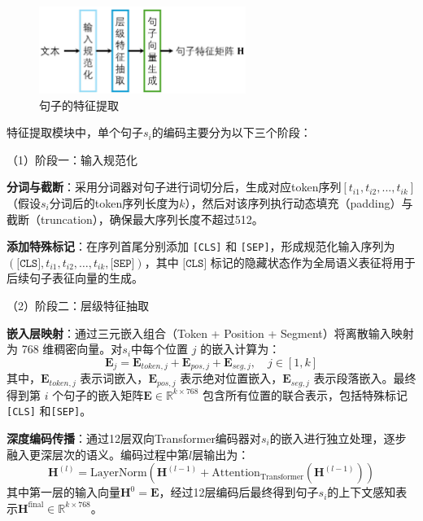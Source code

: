 \begin{figure}[htbp]
    \centering
    \includegraphics[width=0.6\textwidth]{figures/feature_extract.jpg}
    \caption{句子的特征提取}
    \label{fig:method-feature-extract}
\end{figure}

特征提取模块中，单个句子$s_i$的编码主要分为以下三个阶段：

（1）阶段一：输入规范化

\textbf{分词与截断}：采用分词器对句子进行词切分后，生成对应token序列$[t_{i1}, t_{i2}, ..., t_{ik}]$（假设$s_i$分词后的token序列长度为$k$），然后对该序列执行动态填充（padding）与截断（truncation），确保最大序列长度不超过512。

\textbf{添加特殊标记}：在序列首尾分别添加 \texttt{[CLS]} 和 \texttt{[SEP]}，形成规范化输入序列为 \( (\texttt{[CLS]}, t_{i1}, t_{i2}, \ldots, t_{ik}, \texttt{[SEP]}) \)，其中 \(\texttt{[CLS]} \) 标记的隐藏状态作为全局语义表征将用于后续句子表征向量的生成。

（2）阶段二：层级特征抽取

\textbf{嵌入层映射}：通过三元嵌入组合（Token + Position + Segment）将离散输入映射为 768 维稠密向量。对$s_i$中每个位置 $j$ 的嵌入计算为：
\begin{equation}
    \textbf{E}_j = \textbf{E}_{token,j} + \textbf{E}_{pos,j} + \textbf{E}_{seg,j}, \quad j \in [1,k]
\end{equation}
其中，$\textbf{E}_{token,j}$ 表示词嵌入，$\textbf{E}_{pos,j}$ 表示绝对位置嵌入，$\textbf{E}_{seg,j}$ 表示段落嵌入。最终得到第 $i$ 个句子的嵌入矩阵$\textbf{E} \in \mathbb{R}^{k \times 768}$ 包含所有位置的联合表示，包括特殊标记\texttt{[CLS]} 和\texttt{[SEP]}。

\textbf{深度编码传播}：通过12层双向Transformer编码器对$s_i$的嵌入进行独立处理，逐步融入更深层次的语义。编码过程中第$l$层输出为：
\begin{equation}
    \textbf{H}^{(l)} = \text{LayerNorm}\left(\textbf{H}^{(l-1)} + \text{Attention}_\text{Transformer}(\textbf{H}^{(l-1)})\right)
\end{equation}
其中第一层的输入向量$\textbf{H}^0=\textbf{E}$，经过12层编码后最终得到句子$s_i$的上下文感知表示$\textbf{H}^{\text{final}} \in \mathbb{R}^{k \times 768}$。

